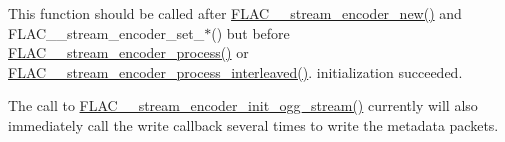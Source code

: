This function should be called after \hyperlink{group__flac__stream__encoder_ga35f3d94452bcf0a90a31c7d770b200bc}{F\+L\+A\+C\+\_\+\+\_\+stream\+\_\+encoder\+\_\+new()} and F\+L\+A\+C\+\_\+\+\_\+stream\+\_\+encoder\+\_\+set\+\_\+$\ast$() but before \hyperlink{group__flac__stream__encoder_gae187ec4f6cab3ca109637996ee23272d}{F\+L\+A\+C\+\_\+\+\_\+stream\+\_\+encoder\+\_\+process()} or \hyperlink{group__flac__stream__encoder_ga67c2ff5b23b945180797de420b1f27c0}{F\+L\+A\+C\+\_\+\+\_\+stream\+\_\+encoder\+\_\+process\+\_\+interleaved()}. initialization succeeded.

The call to \hyperlink{group__flac__stream__encoder_ga87af71d74c09f7d482f9f420ef9bf826}{F\+L\+A\+C\+\_\+\+\_\+stream\+\_\+encoder\+\_\+init\+\_\+ogg\+\_\+stream()} currently will also immediately call the write callback several times to write the metadata packets.


